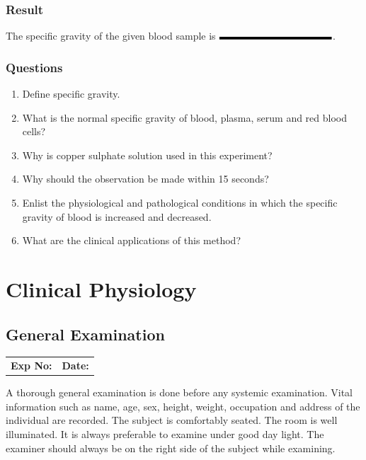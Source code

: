 \documentclass[a4paper,12pt]{book}
\begin{document}
															\section*{Result}
															The specific gravity of the given blood sample is $\rule{4cm}{.1cm}$.
															\section*{Questions}
															\begin{enumerate}
																\item{Define specific gravity.}
																\item{What is the normal specific gravity of blood, plasma, serum and red blood cells?}
																\item{Why is copper sulphate solution used in this experiment?}
																\item{Why should the observation be made within 15 seconds?}
																\item{Enlist the physiological and pathological conditions in which the specific gravity of blood is increased and decreased.}
																\item{What are the clinical applications of this method? }
															\end{enumerate}
															\part{Clinical Physiology}
															\chapter*{\centering General Examination}

															\begin{tabular}{p{5in} p{1in}}
																\textbf{Exp No:}  & \textbf{Date:}\\
															\end{tabular}
															A thorough general examination is done before any systemic examination. Vital information such as name, age, sex, height, weight, occupation and address of the individual are recorded. The subject is comfortably seated. The room is well illuminated. It is always preferable to examine under good day light. The examiner should always be on the right side of the subject while examining.
\end{document}
